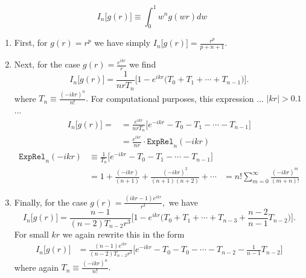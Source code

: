 %
%

$$ I_n\Big[g(r)\Big] \equiv  \int_0^1 w^n g(wr) dw $$

\begin{enumerate}

\item First, for $g(r)=r^p$ we have simply $I_n\big[g(r)\big]=\frac{r^p}{p+n+1}.$

\item Next, for the case $ g(r)=\frac{e^{ikr}}{r}$ we find
$$
   I_n\Big[g(r)\Big]=
       \frac{1}{nrT_n }
       \bigg[ 1- e^{ikr}\Big(T_0 + T_1 + \cdots + T_{n-1}\Big) \bigg].
$$
where $T_n\equiv \frac{ (-ikr)^n } {n!}.$ 
For computational purposes, this expression  ... $|kr|>0.1$ ... 
\begin{align*}
 I_n\Big[g(r)\Big]=
    &=\frac{e^{ikr}}{nrT_n}
       \bigg[ e^{-ikr} - T_0 - T_1 - \cdots - T_{n-1} \bigg]
 \\
    &=\frac{e^{ikr}}{nr} \cdot \texttt{ExpRel}_n(-ikr)
\end{align*}
\begin{align*}
\texttt{ExpRel}_n(-ikr)
 &\equiv \frac{1}{T_n} \bigg[ e^{-ikr} - T_0 - T_1 - \cdots - T_{n-1} \bigg]
\\
 &= 1 + \frac{(-ikr)}{(n+1)} + \frac{(-ikr)^2}{(n+1)(n+2)} + \cdots
 &= n! \sum_{m=0}^\infty \frac{(-ikr)^m}{(m+n)!}
\end{align*}

\item Finally, for the case $g(r)=\frac{(ikr-1)e^{ikr}}{r^3},$ we have 
$$
   I_n\Big[g(r)\Big]=
       \frac{n-1}{(n-2)T_{n-2} r^3 }
       \bigg[ 1- e^{ikr}\Big(T_0 + T_1 + \cdots + T_{n-3} 
                                 + \frac{n-2}{n-1}T_{n-2} \Big)\bigg].
$$
For small $kr$ we again rewrite this in the form
\begin{align*}
 I_n\Big[g(r)\Big]
&=\frac{ (n-1)e^{ikr}}{(n-2)T_{n-2} r^3 }
  \bigg[ e^{-ikr} - T_0 - T_0 - \cdots - T_{n-2} 
                                 - \frac{1}{n-1}T_{n-2}\bigg]
\end{align*}
where again $T_n\equiv \frac{ (-ikr)^n } {n!}.$ 

\end{enumerate}

%
